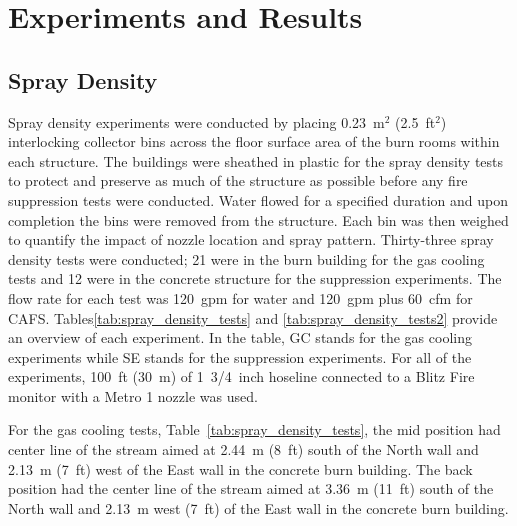 \documentclass[12pt,oneside]{book}
\begin{document}
\chapter{Experiments and Results}
\label{chap:Experiments_and_Results}

\section{Spray Density}
\label{sec:Spray_Density}

Spray density experiments were conducted by placing 0.23~m$^2$ (2.5~ft$^2$) interlocking collector bins across the floor surface area of the burn rooms within each structure. The buildings were sheathed in plastic for the spray density tests to protect and preserve as much of the structure as possible before any fire suppression tests were conducted. Water flowed for a specified duration and upon completion the bins were removed from the structure. Each bin was then weighed to quantify the impact of nozzle location and spray pattern. Thirty-three spray density tests were conducted; 21 were in the burn building for the gas cooling tests and 12 were in the concrete structure for the suppression experiments. The flow rate for each test was 120~gpm for water and 120~gpm plus 60~cfm for CAFS. Tables\ref{tab:spray_density_tests} and \ref{tab:spray_density_tests2} provide an overview of each experiment. In the table, GC stands for the gas cooling experiments while SE stands for the suppression experiments. For all of the experiments, 100~ft (30~m) of 1~3/4~inch hoseline connected to a Blitz Fire monitor with a Metro 1 nozzle was used.

For the gas cooling tests, Table~\ref{tab:spray_density_tests}, the mid position had center line of the stream aimed at 2.44~m (8~ft) south of the North wall and 2.13~m (7~ft) west of the East wall in the concrete burn building. The back position had the center line of the stream aimed at 3.36~m (11~ft) south of the North wall and 2.13~m west (7~ft) of the East wall in the concrete burn building.
\end{document}

